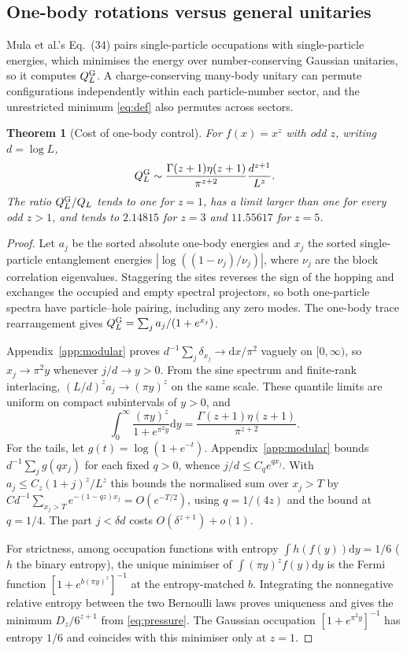 \documentclass[11pt,a4paper]{article}
\newtheorem{theorem}{Theorem}
\theoremstyle{remark}
\newcommand{\dd}{\mathrm d}
\begin{document}
\subsection{One-body rotations versus general unitaries}
Mula et al.'s Eq.~(34) pairs single-particle occupations with single-particle energies, which minimises the energy over number-conserving Gaussian unitaries, so it computes $Q_L^{\rm G}$. A charge-conserving many-body unitary can permute configurations independently within each particle-number sector, and the unrestricted minimum \eqref{eq:def} also permutes across sectors.
\begin{theorem}[Cost of one-body control]\label{thm:gauss}
For $f(x)=x^z$ with odd $z$, writing $d=\log L$,
\[
 Q_L^{\rm G}\sim \frac{\Gamma(z+1)\eta(z+1)}{\pi^{z+2}}\frac{d^{z+1}}{L^z}.
\]
The ratio $Q_L^{\rm G}/Q_L$ tends to one for $z=1$, has a limit larger than one for every odd $z>1$, and tends to $2.14815$ for $z=3$ and $11.55617$ for $z=5$.
\end{theorem}
\begin{proof}
Let $a_j$ be the sorted absolute one-body energies and $x_j$ the sorted single-particle entanglement energies $|\log((1-\nu_j)/\nu_j)|$, where $\nu_j$ are the block correlation eigenvalues. Staggering the sites reverses the sign of the hopping and exchanges the occupied and empty spectral projectors, so both one-particle spectra have particle--hole pairing, including any zero modes. The one-body trace rearrangement gives $Q_L^{\rm G}=\sum_j a_j/(1+e^{x_j})$.

Appendix~\ref{app:modular} proves $d^{-1}\sum_j\delta_{x_j}\to \dd x/\pi^2$ vaguely on $[0,\infty)$, so $x_j\to\pi^2 y$ whenever $j/d\to y>0$. From the sine spectrum and finite-rank interlacing, $(L/d)^z a_j\to(\pi y)^z$ on the same scale. These quantile limits are uniform on compact subintervals of $y>0$, and
\[
 \int_0^\infty\frac{(\pi y)^z}{1+e^{\pi^2 y}}\dd y
   =\frac{\Gamma(z+1)\eta(z+1)}{\pi^{z+2}} .
\]
For the tails, let $g(t)=\log(1+e^{-t})$. Appendix~\ref{app:modular} bounds $d^{-1}\sum_j g(qx_j)$ for each fixed $q>0$, whence $j/d\le C_qe^{qx_j}$. With $a_j\le C_z(1+j)^z/L^z$ this bounds the normalised sum over $x_j>T$ by $C d^{-1}\sum_{x_j>T}e^{-(1-qz)x_j}=O(e^{-T/2})$, using $q=1/(4z)$ and the bound at $q=1/4$. The part $j<\delta d$ costs $O(\delta^{z+1})+o(1)$.

For strictness, among occupation functions with entropy $\int h(f(y))\dd y=1/6$ ($h$ the binary entropy), the unique minimiser of $\int (\pi y)^z f(y)\dd y$ is the Fermi function $[1+e^{b(\pi y)^z}]^{-1}$ at the entropy-matched $b$. Integrating the nonnegative relative entropy between the two Bernoulli laws proves uniqueness and gives the minimum $D_z/6^{z+1}$ from \eqref{eq:pressure}. The Gaussian occupation $[1+e^{\pi^2 y}]^{-1}$ has entropy $1/6$ and coincides with this minimiser only at $z=1$.
\end{proof}
\end{document}
